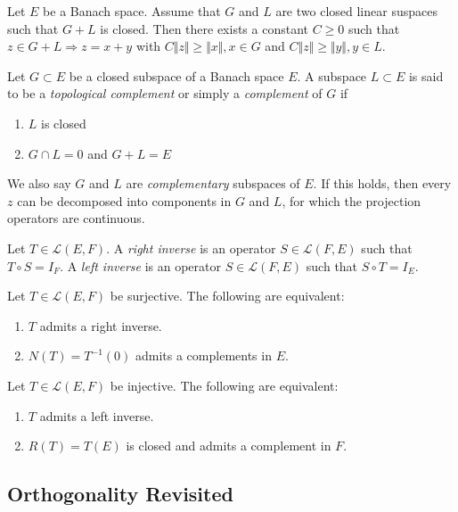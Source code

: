 \begin{thm}
Let $E$ be a Banach space. Assume that $G$ and $L$ are two closed linear suspaces such that $G+L$ is closed. Then there exists a constant $C \geq 0$ such that $z \in G+L \Rightarrow z = x + y$ with $ C \Vert z \Vert \geq \Vert x \Vert, x \in G$ and $ C \Vert z \Vert \geq \Vert y \Vert, y \in L$.

\end{thm}

\begin{defn}
Let $G \subset E$ be a closed subspace of a Banach space $E$. A subspace $L \subset E$ is said to be a \textit{topological complement} or simply a \textit{complement} of $G$ if
\begin{enumerate}
	\item $L$ is closed
	\item $ G \cap L = 0$ and $G+L = E$
\end{enumerate}
We also say $G$ and $L$ are \textit{complementary} subspaces of $E$. If this holds, then every $z$ can be decomposed into components in $G$ and $L$, for which the projection operators are continuous.
\end{defn}

\begin{defn}
	Let $T \in \mathcal{L}(E,F)$. A \textit{right inverse} is an operator $S \in \mathcal{L}(F,E)$ such that $ T \circ S = I_F$. A \textit{left inverse} is an operator $S \in \mathcal{L}(F,E)$ such that $S \circ T = I_E$.
\end{defn}

\begin{thm}
	Let $T \in \mathcal{L}(E,F)$ be surjective. The following are equivalent:
	\begin{enumerate}
		\item $T$ admits a right inverse.
		\item $N(T) = T^{-1}(0)$ admits a complements in $E$.
	\end{enumerate}
\end{thm}

\begin{thm}
	Let $T \in \mathcal{L}(E,F)$ be injective. The following are equivalent:
	\begin{enumerate}
		\item $T$ admits a left inverse.
		\item $R(T) = T(E)$ is closed and admits a complement in $F$.
	\end{enumerate}
\end{thm}

\subsection{Orthogonality Revisited}
